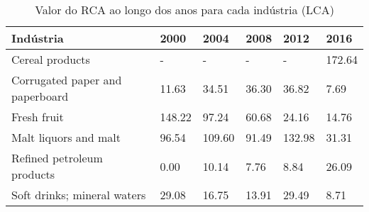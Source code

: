 \begin{table}
\centering
\caption{Valor do RCA ao longo dos anos para cada indústria (LCA)}
\begin{tabular}{p{6cm}p{1.5cm}p{1.5cm}p{1.5cm}p{1.5cm}p{1.5cm}}
\toprule
                      Indústria &   2000 &   2004 &  2008 &   2012 &   2016 \\
\midrule
                Cereal products &      - &      - &     - &      - & 172.64 \\
Corrugated paper and paperboard &  11.63 &  34.51 & 36.30 &  36.82 &   7.69 \\
                    Fresh fruit & 148.22 &  97.24 & 60.68 &  24.16 &  14.76 \\
          Malt liquors and malt &  96.54 & 109.60 & 91.49 & 132.98 &  31.31 \\
     Refined petroleum products &   0.00 &  10.14 &  7.76 &   8.84 &  26.09 \\
    Soft drinks; mineral waters &  29.08 &  16.75 & 13.91 &  29.49 &   8.71 \\
\bottomrule
\end{tabular}
\end{table}
